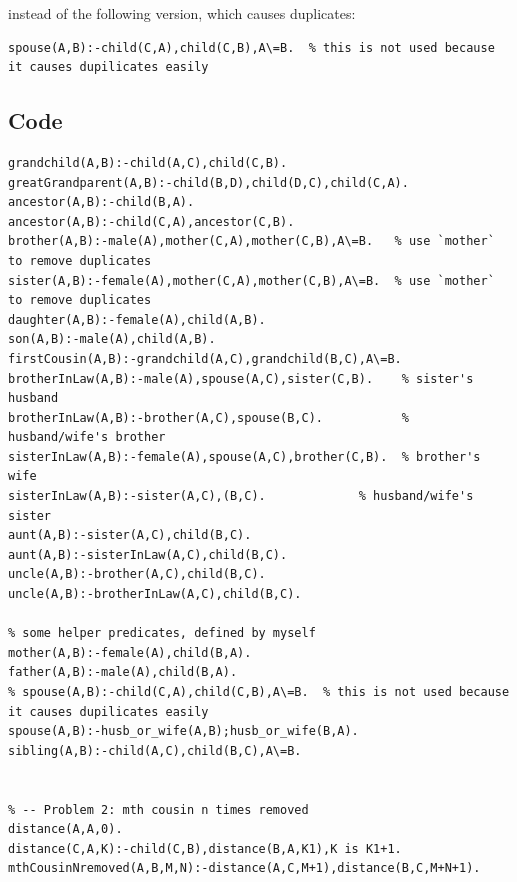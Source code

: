 ﻿\documentclass[a4paper, 11pt]{article}
\begin{document}
instead of the following version, which causes duplicates:
\begin{lstlisting}
spouse(A,B):-child(C,A),child(C,B),A\=B.  % this is not used because it causes dupilicates easily
\end{lstlisting}


\subsection{Code}
\begin{lstlisting}[title=family.pl]
% -- Problem 1: Predicates, expressing that "A is the xxx of B".
grandchild(A,B):-child(A,C),child(C,B).
greatGrandparent(A,B):-child(B,D),child(D,C),child(C,A).
ancestor(A,B):-child(B,A).
ancestor(A,B):-child(C,A),ancestor(C,B).
brother(A,B):-male(A),mother(C,A),mother(C,B),A\=B.   % use `mother` to remove duplicates
sister(A,B):-female(A),mother(C,A),mother(C,B),A\=B.  % use `mother` to remove duplicates
daughter(A,B):-female(A),child(A,B).
son(A,B):-male(A),child(A,B).
firstCousin(A,B):-grandchild(A,C),grandchild(B,C),A\=B.
brotherInLaw(A,B):-male(A),spouse(A,C),sister(C,B).    % sister's husband
brotherInLaw(A,B):-brother(A,C),spouse(B,C).           % husband/wife's brother
sisterInLaw(A,B):-female(A),spouse(A,C),brother(C,B).  % brother's wife
sisterInLaw(A,B):-sister(A,C),(B,C).             % husband/wife's sister
aunt(A,B):-sister(A,C),child(B,C).
aunt(A,B):-sisterInLaw(A,C),child(B,C).
uncle(A,B):-brother(A,C),child(B,C).
uncle(A,B):-brotherInLaw(A,C),child(B,C).

% some helper predicates, defined by myself
mother(A,B):-female(A),child(B,A).
father(A,B):-male(A),child(B,A).
% spouse(A,B):-child(C,A),child(C,B),A\=B.  % this is not used because it causes dupilicates easily
spouse(A,B):-husb_or_wife(A,B);husb_or_wife(B,A).
sibling(A,B):-child(A,C),child(B,C),A\=B.


% -- Problem 2: mth cousin n times removed
distance(A,A,0).
distance(C,A,K):-child(C,B),distance(B,A,K1),K is K1+1.
mthCousinNremoved(A,B,M,N):-distance(A,C,M+1),distance(B,C,M+N+1).



\end{lstlisting}
\end{document}
